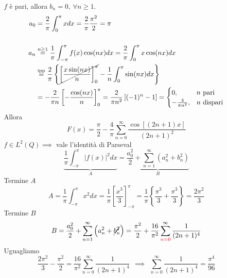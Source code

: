 $f$ è pari, allora $b_{n} = 0,\ \forall n\geq 1$.
\begin{align*}
a_{0} & = \frac{2}{\pi }\int ^{\pi }_{0} xdx = \frac{2}{\pi }\frac{\pi ^{2}}{2} = \pi \\
 & \\
a_{n} & \overset{n\geq 1}{ = }\frac{1}{\pi }\int ^{\pi }_{ - \pi } f(x)\cos(nx) dx = \frac{2}{\pi }\int ^{\pi }_{0} x\cos(nx) dx\\
 & \overset{\text{ipp}}{ = }\frac{2}{\pi }\left\{\cancel{\left[\frac{x\sin(nx)}{n}\right]^{\pi }_{0}} - \frac{1}{n}\int ^{\pi }_{0}\sin(nx) dx\right\}\\
 & = - \frac{2}{\pi n}\left[ - \frac{\cos(nx)}{n}\right]^{\pi }_{0} = \frac{2}{\pi n^{2}}\left[(- 1)^{n} - 1\right] = 
 \begin{cases}
0, & n\ \text{pari}\\
- \frac{4}{\pi n^{2}} , & n\ \text{dispari}
\end{cases}
\end{align*}
Allora
\begin{equation*}
F(x) = \frac{\pi }{2} - \frac{4}{\pi }\sum\limits ^{\infty }_{n = 0}\frac{\cos[(2n + 1) x]}{(2n + 1)^{2}}
\end{equation*}
$f\in L^{2}(Q) \implies $ vale l'identità di Parseval
\begin{equation*}
\underbrace{\frac{1}{\pi }\int ^{\pi }_{ - \pi }| f(x)| ^{2} dx}_{A} = \underbrace{\frac{a^{2}_{0}}{2} + \sum\limits ^{\infty }_{n = 1}\left(a^{2}_{n} + b^{2}_{n}\right)}_{B}
\end{equation*}
Termine $A$
\begin{equation*}
A = \frac{1}{\pi }\int ^{\pi }_{ - \pi } x^{2} dx = \frac{1}{\pi }\left[\frac{x^{3}}{3}\right]^{\pi }_{ - \pi } = \frac{1}{\pi }\left\{\frac{\pi ^{3}}{3} + \frac{\pi ^{3}}{3}\right\} = \frac{2\pi ^{2}}{3}
\end{equation*}
Termine $B$
\begin{equation*}
B = \frac{a^{2}_{0}}{2} + \sum\limits ^{\infty }_{n = 1}\left(a^{2}_{n} + \cancel{b^{2}_{n}}\right) = \frac{\pi ^{2}}{2} + \frac{16}{\pi ^{2}}\sum\limits ^{\infty }_{\textcolor[rgb]{0.82,0.01,0.11}{n = 0}}\frac{1}{(2n + 1)^{4}}
\end{equation*}
Uguagliamo
\begin{equation*}
\frac{2\pi ^{2}}{3} - \frac{\pi ^{2}}{2} = \frac{16}{\pi ^{2}}\sum\limits ^{\infty }_{n = 0}\frac{1}{(2n + 1)^{4}} \ \ \implies \ \ \sum\limits ^{\infty }_{n = 0}\frac{1}{(2n + 1)^{4}} = \frac{\pi ^{4}}{96}
\end{equation*}

